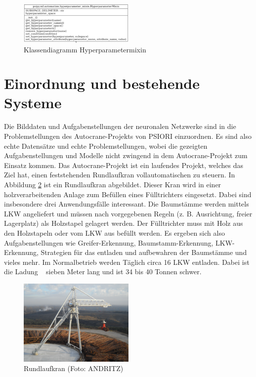 	\begin{figure}[h]
		\centering
		\includegraphics[width=0.5\textwidth, center]{bilder/Klassendiagramme/Hyperparametermixin.png}
		\caption[Klassendiagramm Hyperparametermixin]{Klassendiagramm Hyperparametermixin}
		\label{img:KlassendiagrammHyperparametermixin}
	\end{figure}  
	
	\section{Einordnung und bestehende Systeme}
	\label{sec:BestehendesSystem}
	Die Bilddaten und Aufgabenstellungen der neuronalen Netzwerke sind in die Problemstellungen des Autocrane-Projekts von PSIORI einzuordnen. Es sind also echte Datensätze und echte Problemstellungen, wobei die gezeigten Aufgabenstellungen und Modelle nicht zwingend in dem Autocrane-Projekt zum Einsatz kommen. Das Autocrane-Projekt ist ein laufendes Projekt, welches das Ziel hat, einen feststehenden Rundlaufkran vollautomatischen zu steuern. In Abbildung \ref{img:CircularCrane} ist ein Rundlaufkran abgebildet. Dieser Kran wird in einer holzverarbeitenden Anlage zum Befüllen eines Fülltrichters eingesetzt. Dabei sind insbesondere drei Anwendungsfälle interessant. Die Baumstämme werden mittels LKW angeliefert und müssen nach vorgegebenen Regeln (z. B. Ausrichtung, freier Lagerplatz) als Holzstapel gelagert werden. Der Fülltrichter muss mit Holz aus den Holzstapeln oder vom LKW aus befüllt werden. Es ergeben sich also Aufgabenstellungen wie Greifer-Erkennung, Baumstamm-Erkennung, LKW-Erkennung, Strategien für das entladen und aufbewahren der Baumstämme und vieles mehr. Im Normalbetrieb werden Täglich circa 16 LKW entladen. Dabei ist die Ladung ~ sieben Meter lang und ist 34 bis 40 Tonnen schwer.  \cite{PSIORIGmbH.2020}
	\begin{figure}[h]
		\centering
		\includegraphics[width=0.5\textwidth, center]{bilder/Grundlagen/Kran_vollstaendig_N1_030.jpg}
		\caption[Rund-Kran]{Rundlaufkran (Foto: ANDRITZ)}
		\label{img:CircularCrane}
	\end{figure}		

